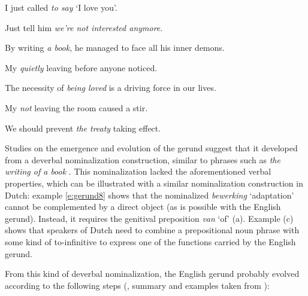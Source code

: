 \ea
\label{e:gerund1}
I just called \emph{to say} `I love you'.
\item Just tell him \emph{we're not interested anymore}.
\label{e:gerund2}
\item By writing \emph{a book}, he managed to face all his inner demons.
\label{e:gerund3}
\item My \emph{quietly} leaving before anyone noticed.
\label{e:gerund4}
\item The necessity of \emph{being loved} is a driving force in our lives.
\label{e:gerund5}
\item My \emph{not} leaving the room caused a stir.
\label{e:gerund6}
\item We should prevent \emph{the treaty} taking effect.
\label{e:gerund7}
\z

Studies on the emergence and evolution of the gerund suggest that it developed from a deverbal nominalization construction, similar to phrases such as \emph{the writing of a book} \citep{tajima85syntactic}. This nominalization lacked the aforementioned verbal properties, which can be illustrated with a similar nominalization construction in Dutch: example \ref{e:gerund8} shows that the nominalized \emph{bewerking} `adaptation' cannot be complemented by a direct object (as is possible with the English gerund). Instead, it requires the genitival preposition \emph{van} `of' (a). Example (c) shows that speakers of Dutch need to combine a prepositional noun phrase with some kind of  to-infinitive to express one of the functions carried by the English gerund.

\eal
\label{e:gerund8}
\zl

From this kind of deverbal nominalization, the English gerund probably evolved according to the following steps (\citealp{tajima85syntactic}, summary and examples taken from \citealt{fanego04reanalysis}):

